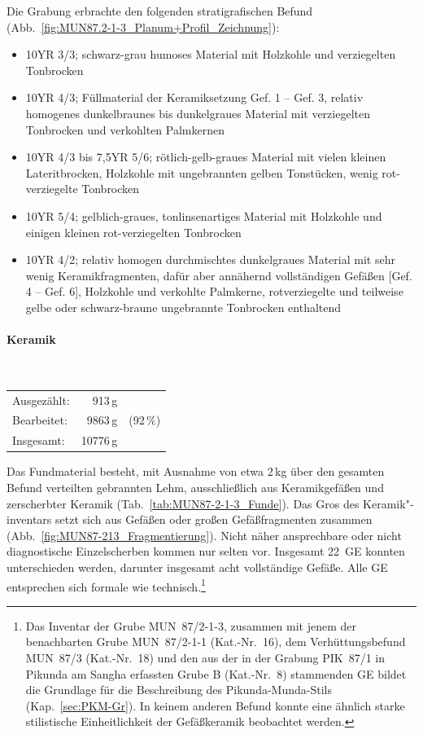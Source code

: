 \noindent Die Grabung erbrachte den folgenden stratigrafischen Befund (Abb.~\ref{fig:MUN87.2-1-3_Planum+Profil_Zeichnung}):
\begin{itemize}[leftmargin=*, labelindent=1.25em, noitemsep, topsep=0pt]
	\item [(1)] 10YR 3/3; schwarz-grau humoses Material mit Holzkohle und verziegelten Tonbrocken
	\item [(2)] 10YR 4/3; Füllmaterial der Keramiksetzung Gef. 1 – Gef. 3, relativ homogenes dunkelbraunes bis dunkelgraues Material mit verziegelten Tonbrocken und verkohlten Palmkernen
	\item [(3)] 10YR 4/3 bis 7,5YR 5/6; rötlich-gelb-graues Material mit vielen kleinen Lateritbrocken, Holzkohle mit ungebrannten gelben Tonstücken, wenig rot-verziegelte Tonbrocken
	\item [(4)] 10YR 5/4; gelblich-graues, tonlinsenartiges Material mit Holzkohle und einigen kleinen rot-verziegelten Tonbrocken
	\item [(5)] 10YR 4/2; relativ homogen durchmischtes dunkelgraues Material mit sehr wenig Keramikfragmenten, dafür aber annähernd vollständigen Gefäßen [Gef. 4 – Gef. 6], Holzkohle und verkohlte Palmkerne, rotverziegelte und teilweise gelbe oder schwarz-braune ungebrannte Tonbrocken enthaltend
\end{itemize}

\columnbreak
\paragraph{Keramik\vspace{.5em}}\mbox{}\\
\begin{tabular}{@{}lrl@{}}
Ausgezählt: & 913\,g & \\ 
Bearbeitet: & 9863\,g & (92\,\%) \\ 
Insgesamt: & 10776\,g & \\ 
\end{tabular}

\vspace{1em}
\noindent Das Fundmaterial besteht, mit Ausnahme von etwa 2\,kg über den gesamten Befund verteilten gebrannten Lehm, ausschließlich aus Keramikgefäßen und zerscherbter Keramik (Tab.~\ref{tab:MUN87-2-1-3_Funde}). Das Gros des Keramik"-inventars setzt sich aus Gefäßen oder großen Gefäßfragmenten zusammen (Abb.~\ref{fig:MUN87-213_Fragmentierung}). Nicht näher ansprechbare oder nicht diagnostische Einzelscherben kommen nur selten vor. Insgesamt 22~GE konnten unterschieden werden, darunter insgesamt acht vollständige Gefäße. Alle GE entsprechen sich formale wie technisch.\footnote{Das Inventar der Grube MUN~87/2-1-3, zusammen mit jenem der benachbarten Grube MUN~87/2-1-1 (Kat.-Nr.~16), dem Verhüttungsbefund MUN~87/3 (Kat.-Nr.~18) und den aus der in der Grabung PIK~87/1 in Pikunda am \mbox{Sangha} erfassten Grube B (Kat.-Nr.~8) stammenden GE bildet die Grundlage für die Beschreibung des Pikunda-Munda-Stils (Kap.~\ref{sec:PKM-Gr}). In keinem anderen Befund konnte eine ähnlich starke stilistische Einheitlichkeit der Gefäßkeramik beobachtet werden.}

